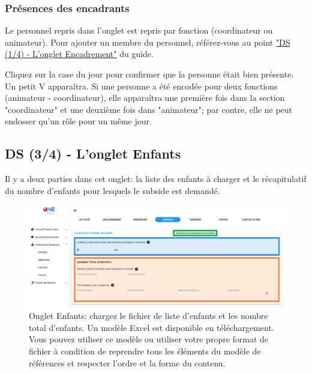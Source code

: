 \subsubsection{Présences des encadrants}
Le personnel repris dans l'onglet  est repris par fonction (coordinateur ou animateur). Pour ajouter un membre du personnel, référez-vous au point \hyperref[encadrementcdv]{"DS (1/4) ‐ L’onglet Encadrement"} du guide.

\begin{tcolorbox}[title=Comment encoder les présences des encadrants ?]
Cliquez sur la case du jour pour confirmer que la personne était bien présente. Un petit {\color{bleu}V} apparaîtra. Si une personne a été encodée pour deux fonctions (animateur - coordinateur), elle apparaîtra une première fois dans la section "coordinateur" et une deuxième fois dans "animateur"; par contre, elle ne peut endosser qu'un rôle pour un même jour. 
\end{tcolorbox}

\subsection{DS (3/4) - L'onglet Enfants}
Il y a deux parties dans cet onglet: la \textcolor{bleu}{liste des enfants à charger} et le \textcolor{ocre}{récapitulatif du nombre d'enfants} pour lesquels le subside est demandé. 

\begin{figure}[h]
    \centering
    \includegraphics[width=15cm]{Images/cdv/cdv-ds-enfants.png}
    \caption{Onglet Enfants: chargez le fichier de liste d'enfants et les nombre total d'enfants. Un modèle Excel est disponible en téléchargement. Vous pouvez utiliser ce modèle ou utiliser votre propre format de fichier à condition de reprendre tous les éléments du modèle de références et respecter l'ordre et la forme du contenu.}
    \label{fig:cdv_enfants}
\end{figure}


